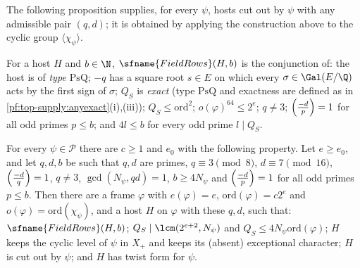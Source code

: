 The following proposition supplies, for every $\psi$, hosts cut out by $\psi$ with any admissible pair $(q,d)$; it is
obtained by applying the construction above to the cyclic group $\langle\chi_\psi\rangle$.

\begin{definition}\label{pf:top-supply:fieldrows}
For a host $H$ and $b\in\N$, $\sfname{FieldRows}(H,b)$ is the conjunction of: the host is of \emph{type $\mathrm{PsQ}$};
$-q$ has a square root $s\in E$ on which every $\sigma\in\Gal(E/\Q)$ acts by the first sign of $\sigma$; $Q_S$ is
\emph{exact} (type $\mathrm{PsQ}$ and exactness are defined as in \cref{pf:top-supply:anyexact}(i),(iii)); $Q_S\le\mathrm{ord}^2$; $o(\varphi)^{64}\le2^{e}$; $q\ne3$; $\left(\frac{-d}{p}\right)=1$ for all odd primes $p\le b$;
and $4l\le b$ for every odd prime $l\mid Q_S$.
\end{definition}

\begin{proposition}\label{pf:top-supply:fieldchi}
For every $\psi\in\mathcal P$ there are $c\ge1$ and $e_0$ with the following property. Let $e\ge e_0$, and let $q,d,b$ be
such that $q,d$ are primes, $q\equiv3\pmod8$, $d\equiv7\pmod{16}$, $\left(\frac{-d}{q}\right)=1$, $q\ne3$, $\gcd(N_\psi,qd)=1$,
$b\ge4N_\psi$ and $\left(\frac{-d}{p}\right)=1$ for all odd primes $p\le b$. Then there are a frame $\varphi$ with $e(\varphi)=e$,
$\mathrm{ord}(\varphi)=c2^e$ and $o(\varphi)=\mathrm{ord}(\chi_\psi)$, and a host $H$ on $\varphi$ with these $q,d$, such that:
$\sfname{FieldRows}(H,b)$; $Q_S\mid\lcm(2^{e+2},N_\psi)$ and $Q_S\le4N_\psi\mathrm{ord}(\varphi)$; $H$ keeps the cyclic level of
$\psi$ in $X_+$ and keeps its (absent) exceptional character; $H$ is cut out by $\psi$; and $H$ has twist form for $\psi$.
\end{proposition}

